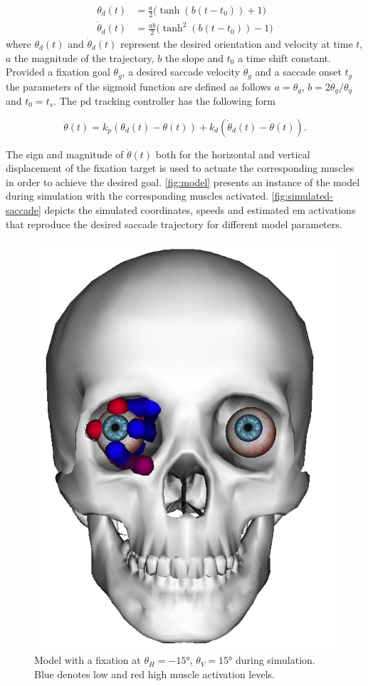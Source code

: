 \documentclass[11pt,a4paper,draft=false]{report}
\begin{document}
\begin{equation}\label{equ:sigmoid}
  \begin{aligned}
    \theta_d(t) &= \frac{a}{2} \Big(\tanh(b (t - t_0)) + 1\Big) \\
    \dot{\theta}_d(t) &= \frac{a b}{2} \Big(\tanh^2(b (t - t_0)) - 1\Big)
  \end{aligned}
\end{equation}
% 
where $\theta_d(t)$ and $\dot{\theta}_d(t)$ represent the desired orientation
and velocity at time $t$, $a$ the magnitude of the trajectory, $b$ the slope and
$t_0$ a time shift constant. Provided a fixation goal $\theta_g$, a desired
saccade velocity $\dot{\theta}_g$ and a saccade onset $t_g$ the parameters of
the sigmoid function are defined as follows $a = \theta_g$,
$b = 2 \dot{\theta}_g / \theta_g$ and $t_0 = t_s$. The \gls{pd} tracking
controller has the following form

\begin{equation}\label{equ:pd-controller}
  \ddot{\theta}(t) = k_p (\theta_d(t) - \theta(t)) + k_d (\dot{\theta}_d(t) -
  \dot{\theta}(t)).
\end{equation}

The sign and magnitude of $\ddot{\theta}(t)$ both for the horizontal and
vertical displacement of the fixation target is used to actuate the
corresponding muscles in order to achieve the desired goal. \autoref{fig:model}
presents an instance of the model during simulation with the corresponding
muscles activated. \autoref{fig:simulated-saccade} depicts the simulated
coordinates, speeds and estimated \gls{em} activations that reproduce the
desired saccade trajectory for different model parameters.

\begin{figure}[ht]
  \centering
  \includegraphics[width=.7\textwidth]{eye-model.png}
  \caption{Model with a fixation at $\theta_H = -15 \si{\degree}$,
    $\theta_V = 15 \si{\degree}$ during simulation. Blue denotes low and red high
    muscle activation levels.}\label{fig:model}
\end{figure}
\end{document}
